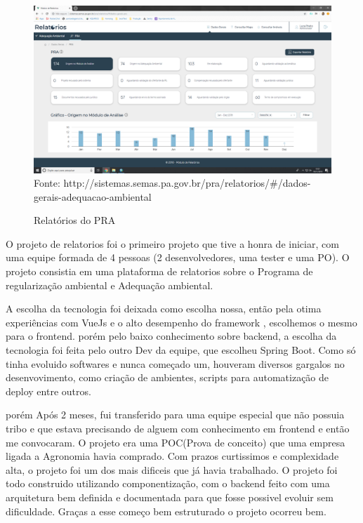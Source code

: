 \begin{figure}[H]
\centering
\caption{Relatórios do PRA} %
\includegraphics[scale=0.22]{relatorios-pra}\\  %
{\small Fonte: http://sistemas.semas.pa.gov.br/pra/relatorios/#/dados-gerais-adequacao-ambiental} %
\label{fig:exemplo} %
\end{figure}

O projeto de relatorios foi o primeiro projeto que tive a honra de iniciar, com uma equipe formada de 4 pessoas (2 desenvolvedores, uma tester e uma PO).
O projeto consistia em uma plataforma de relatorios sobre o Programa de regularização ambiental e Adequação ambiental.

A escolha da tecnologia foi deixada como escolha nossa, então pela otima experiências com VueJs e o alto desempenho do framework , escolhemos o mesmo para o frontend.
porém pelo baixo conhecimento sobre backend, a escolha da tecnologia foi feita pelo outro Dev da equipe, que escolheu Spring Boot.
Como só tinha evoluido softwares e nunca começado um, houveram diversos gargalos no desenvovimento, como criação de ambientes, scripts para automatização de deploy entre outros.

porém Após 2 meses, fui transferido para uma equipe especial que não possuia tribo e que estava precisando de alguem com conhecimento em frontend e então me convocaram.
O projeto era uma POC(Prova de conceito) que uma empresa ligada a Agronomia havia comprado. Com prazos curtissimos e complexidade alta, o projeto foi um dos mais dificeis que já havia trabalhado.
O projeto foi todo construido utilizando componentização, com o backend feito com uma arquitetura bem definida e documentada para que fosse possivel evoluir sem dificuldade. Graças a esse começo bem estruturado o projeto ocorreu bem.

